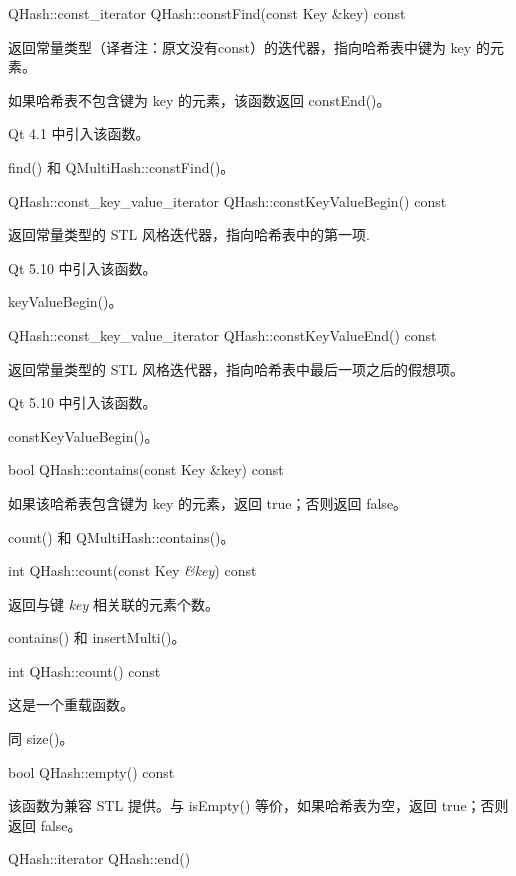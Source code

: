 QHash::const\_iterator QHash::constFind(const Key \&key) const

返回常量类型（译者注：原文没有const）的迭代器，指向哈希表中键为 key 的元素。

如果哈希表不包含键为 key 的元素，该函数返回 constEnd()。

Qt 4.1 中引入该函数。


\begin{seeAlso}
find() 和 QMultiHash::constFind()。
\end{seeAlso}

QHash::const\_key\_value\_iterator QHash::constKeyValueBegin() const

返回常量类型的 STL 风格迭代器，指向哈希表中的第一项.

Qt 5.10 中引入该函数。

\begin{seeAlso}
keyValueBegin()。
\end{seeAlso}

QHash::const\_key\_value\_iterator QHash::constKeyValueEnd() const

返回常量类型的 STL 风格迭代器，指向哈希表中最后一项之后的假想项。

Qt 5.10 中引入该函数。

\begin{seeAlso}
constKeyValueBegin()。
\end{seeAlso}

bool QHash::contains(const Key \&key) const

如果该哈希表包含键为 key 的元素，返回 true；否则返回 false。

\begin{seeAlso}
count() 和 QMultiHash::contains()。
\end{seeAlso}

int QHash::count(const Key \emph{\&key}) const

返回与键 \emph{key} 相关联的元素个数。

\begin{seeAlso}
contains() 和 insertMulti()。
\end{seeAlso}

int QHash::count() const

这是一个重载函数。

同 size()。

bool QHash::empty() const

该函数为兼容 STL 提供。与 isEmpty() 等价，如果哈希表为空，返回 true；否则返回 false。

QHash::iterator QHash::end()

